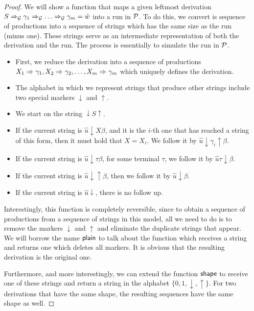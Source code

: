 \begin{proof}
We will show a function that maps a given leftmost derivation $S\Rightarrow_{\mathcal{G}} \gamma_1\Rightarrow_{\mathcal{G}}\ldots\Rightarrow_{\mathcal{G}}\gamma_m = \hat{w}$ into a run in $\mathcal{P}$. To do this, we convert is sequence of productions into a sequence of strings which has the same size as the run (minus one). These strings serve as an intermediate representation of both the derivation and the run. The process is essentially to simulate the run in $\mathcal{P}$.
\begin{itemize}
	\item First, we reduce the derivation into a sequence of productions $X_1\Rightarrow_{}\gamma_1, X_2\Rightarrow_{}\gamma_2,\ldots, X_m\Rightarrow_{}\gamma_m$ which uniquely defines the derivation. 
	\item The alphabet in which we represent strings that produce other strings include two special markers $\downarrow$ and $\uparrow$.
	\item We start on the string $\downarrow S\uparrow$.
	\item If the current string is $\hat{u} \downarrow X \beta$, and it is the $i$-th one that has reached a string of this form, then it must hold that $X = X_i$. We follow it by $\hat{u} \downarrow \gamma_i\uparrow\beta$.
	\item If the current string is $\hat{u}\downarrow \tau\beta$, for some terminal $\tau$, we follow it by $\hat{u} \tau \downarrow \beta$.
	\item If the current string is $\hat{u}\downarrow\uparrow\beta$, then we follow it by $\hat{u}\downarrow\beta$.
	\item If the current string is $\hat{u}\downarrow$, there is no follow up.
\end{itemize}
Interestingly, this function is completely reversible, since to obtain a sequence of productions from a sequence of strings in this model, all we need to do is to remove the markers $\downarrow$ and $\uparrow$ and eliminate the duplicate strings that appear. We will borrow the name $\textsf{plain}$ to talk about the function which receives a string and returns one which deletes all markers. It is obvious that the resulting derivation is the original one. 

Furthermore, and more interestingly, we can extend the function $\mathsf{shape}$ to receive one of these strings and return a string in the alphabet $\{0, 1, \downarrow, \uparrow\}$. For two derivations that have the same shape, the resulting sequences have the same shape as well.


\end{proof}

